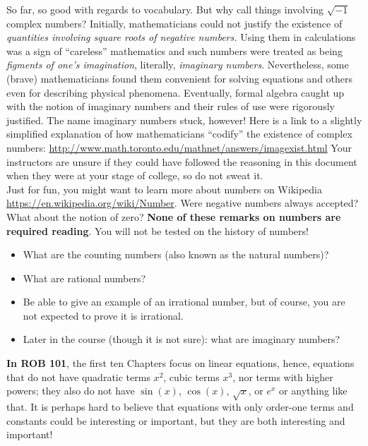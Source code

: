 So far, so good with regards to vocabulary. But why call things involving $\sqrt{-1}$ complex numbers? Initially, mathematicians could not justify the existence of \textit{quantities involving square roots of negative numbers.} Using them in calculations was a sign of ``careless'' mathematics and such numbers were treated as being \textit{figments of one's imagination}, literally, \textit{imaginary numbers}. Nevertheless, some (brave) mathematicians found them convenient for solving equations and others even for describing physical phenomena. Eventually, formal algebra caught up with the notion of imaginary numbers and their rules of use were rigorously justified. The name imaginary numbers stuck, however! Here is a link to a slightly simplified explanation of how mathematicians ``codify'' the existence of complex numbers:  \url{http://www.math.toronto.edu/mathnet/answers/imagexist.html} Your instructors are unsure if they could have followed the reasoning in this document when they were at your stage of college, so do not sweat it.\\

Just for fun, you might want to learn more about numbers on Wikipedia \url{https://en.wikipedia.org/wiki/Number}. Were negative numbers always accepted? What about the notion of zero? \textbf{None of these remarks on numbers are required reading}. You will not be tested on the history of numbers!\\

\begin{tcolorbox}[title=\textbf{To Know}]
\begin{itemize}
    \item What are the counting numbers (also known as the natural numbers)? 
    \item What are rational numbers?
    \item Be able to give an example of an irrational number, but of course, you are not expected to prove it is irrational. 
    \item Later in the course (though it is not sure): what are imaginary numbers? 
\end{itemize}
\end{tcolorbox}

\newpage

\noindent \textbf{In ROB 101}, the first ten Chapters focus on linear equations, hence, equations that do not have quadratic terms $x^2$, cubic terms $x^3$, nor terms with higher powers; they also do not have $\sin(x)$, $\cos(x)$, $\sqrt{x}$, or $e^x$ or anything like that. It is perhaps hard to believe that equations with only order-one terms and constants could be interesting or important, but they are both interesting and important! 

